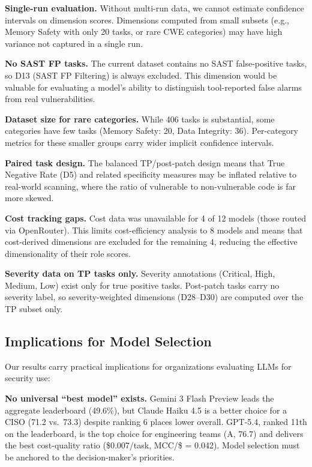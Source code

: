 \documentclass[10pt,twocolumn]{article}
\begin{document}
\textbf{Single-run evaluation.} Without multi-run data, we cannot estimate confidence intervals on dimension scores. Dimensions computed from small subsets (e.g., Memory Safety with only 20 tasks, or rare CWE categories) may have high variance not captured in a single run.

\textbf{No SAST FP tasks.} The current dataset contains no SAST false-positive tasks, so D13 (SAST FP Filtering) is always excluded. This dimension would be valuable for evaluating a model's ability to distinguish tool-reported false alarms from real vulnerabilities.

\textbf{Dataset size for rare categories.} While 406 tasks is substantial, some categories have few tasks (Memory Safety: 20, Data Integrity: 36). Per-category metrics for these smaller groups carry wider implicit confidence intervals.

\textbf{Paired task design.} The balanced TP/post-patch design means that True Negative Rate (D5) and related specificity measures may be inflated relative to real-world scanning, where the ratio of vulnerable to non-vulnerable code is far more skewed.

\textbf{Cost tracking gaps.} Cost data was unavailable for 4 of 12 models (those routed via OpenRouter). This limits cost-efficiency analysis to 8 models and means that cost-derived dimensions are excluded for the remaining 4, reducing the effective dimensionality of their role scores.

\textbf{Severity data on TP tasks only.} Severity annotations (Critical, High, Medium, Low) exist only for true positive tasks. Post-patch tasks carry no severity label, so severity-weighted dimensions (D28--D30) are computed over the TP subset only.

\subsection{Implications for Model Selection}

Our results carry practical implications for organizations evaluating LLMs for security use:

\textbf{No universal ``best model'' exists.} Gemini 3 Flash Preview leads the aggregate leaderboard (49.6\%), but Claude Haiku 4.5 is a better choice for a CISO (71.2 vs.\ 73.3) despite ranking 6 places lower overall. GPT-5.4, ranked 11th on the leaderboard, is the top choice for engineering teams (A, 76.7) and delivers the best cost-quality ratio (\$0.007/task, MCC/\$ = 0.042). Model selection must be anchored to the decision-maker's priorities.
\end{document}
